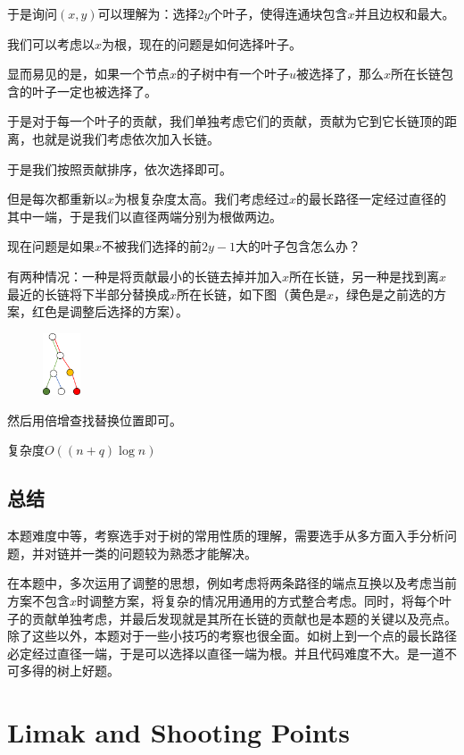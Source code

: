 \documentclass[12pt]{article}
\begin{document}
于是询问$(x,y)$可以理解为：选择$2y$个叶子，使得连通块包含$x$并且边权和最大。

我们可以考虑以$x$为根，现在的问题是如何选择叶子。

显而易见的是，如果一个节点$x$的子树中有一个叶子$u$被选择了，那么$x$所在长链包含的叶子一定也被选择了。

于是对于每一个叶子的贡献，我们单独考虑它们的贡献，贡献为它到它长链顶的距离，也就是说我们考虑依次加入长链。

于是我们按照贡献排序，依次选择即可。

但是每次都重新以$x$为根复杂度太高。我们考虑经过$x$的最长路径一定经过直径的其中一端，于是我们以直径两端分别为根做两边。

现在问题是如果$x$不被我们选择的前$2y-1$大的叶子包含怎么办？

有两种情况：一种是将贡献最小的长链去掉并加入$x$所在长链，另一种是找到离$x$最近的长链将下半部分替换成$x$所在长链，如下图（黄色是$x$，绿色是之前选的方案，红色是调整后选择的方案）。

\begin{figure}[h]
  \centering
  \includegraphics[width=0.1\textwidth]{p7.png}
  \label{p3}
\end{figure}

然后用倍增查找替换位置即可。

复杂度$O((n+q)\log n)$

\subsection{总结}
本题难度中等，考察选手对于树的常用性质的理解，需要选手从多方面入手分析问题，并对链并一类的问题较为熟悉才能解决。

在本题中，多次运用了调整的思想，例如考虑将两条路径的端点互换以及考虑当前方案不包含$x$时调整方案，将复杂的情况用通用的方式整合考虑。同时，将每个叶子的贡献单独考虑，并最后发现就是其所在长链的贡献也是本题的关键以及亮点。除了这些以外，本题对于一些小技巧的考察也很全面。如树上到一个点的最长路径必定经过直径一端，于是可以选择以直径一端为根。并且代码难度不大。是一道不可多得的树上好题。

\newpage

\section{Limak and Shooting Points}
\end{document}
